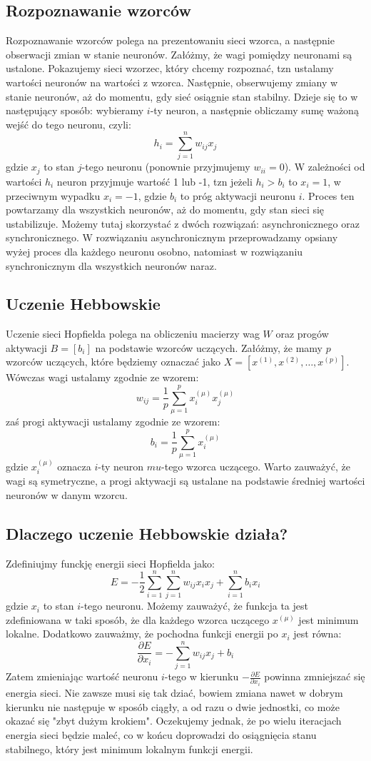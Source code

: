 \documentclass{article}
\begin{document}
\subsection{Rozpoznawanie wzorców}
Rozpoznawanie wzorców polega na prezentowaniu sieci wzorca, a następnie obserwacji zmian w stanie neuronów.
Załóżmy, że wagi pomiędzy neuronami są ustalone.
Pokazujemy sieci wzorzec, który chcemy rozpoznać, tzn ustalamy wartości neuronów na wartości z wzorca.
Następnie, obserwujemy zmiany w stanie neuronów, aż do momentu, gdy sieć osiągnie stan stabilny.
Dzieje się to w następujący sposób: wybieramy $i$-ty neuron, 
a następnie obliczamy sumę ważoną wejść do tego neuronu, czyli:
$$h_i = \sum_{j=1}^{n} w_{ij} x_j$$
gdzie $x_j$ to stan $j$-tego neuronu (ponownie przyjmujemy $w_{ii} = 0$). 
W zależności od wartości $h_i$ neuron przyjmuje wartość 1 lub -1, 
tzn jeżeli $h_i > b_{i}$ to $x_i = 1$, w przeciwnym wypadku $x_i = -1$,
gdzie $b_{i}$ to próg aktywacji neuronu $i$. Proces ten powtarzamy dla wszystkich neuronów, aż do momentu, gdy stan sieci się ustabilizuje.
Możemy tutaj skorzystać z dwóch rozwiązań: asynchronicznego oraz synchronicznego.
W rozwiązaniu asynchronicznym przeprowadzamy opsiany wyżej proces dla każdego neuronu osobno,
natomiast w rozwiązaniu synchronicznym dla wszystkich neuronów naraz.


\subsection{Uczenie Hebbowskie}
Uczenie sieci Hopfielda polega na obliczeniu macierzy wag $W$ oraz progów aktywacji $B = [b_i]$ 
na podstawie wzorców uczących. Załóżmy, że mamy $p$ wzorców uczących, które będziemy oznaczać jako $X = [x^{(1)}, x^{(2)}, \ldots, x^{(p)}]$.
Wówczas wagi ustalamy zgodnie ze wzorem:
$$w_{ij} = \frac{1}{p} \sum_{\mu=1}^{p} x_i^{(\mu)} x_j^{(\mu)}$$
zaś progi aktywacji ustalamy zgodnie ze wzorem:
$$b_i = \frac{1}{p}\sum_{\mu=1}^{p} x_i^{(\mu)}$$
gdzie $x_i^{(\mu)}$ oznacza $i$-ty neuron $mu$-tego wzorca uczącego.
Warto zauważyć, że wagi są symetryczne, a progi aktywacji są ustalane na podstawie średniej wartości neuronów w danym wzorcu.

\subsection{Dlaczego uczenie Hebbowskie działa?}
Zdefiniujmy funckję energii sieci Hopfielda jako:
$$E = -\frac{1}{2} \sum_{i=1}^{n} \sum_{j=1}^{n} w_{ij} x_i x_j + \sum_{i=1}^{n} b_i x_i$$
gdzie $x_i$ to stan $i$-tego neuronu.
Możemy zauważyć, że funkcja ta jest zdefiniowana w taki sposób, że dla każdego wzorca uczącego $x^{(\mu)}$ jest minimum lokalne.
Dodatkowo zauważmy, że pochodna funkcji energii po $x_i$ jest równa:
$$\frac{\partial E}{\partial x_i} = -\sum_{j=1}^{n} w_{ij} x_j + b_i$$
Zatem zmieniając wartość neuronu $i$-tego w kierunku $-\frac{\partial E}{\partial x_i}$ powinna zmniejszać się energia sieci.
Nie zawsze musi się tak dziać, bowiem zmiana nawet w dobrym kierunku nie następuje w sposób ciągły, a od razu o dwie jednostki,
co może okazać się "zbyt dużym krokiem". Oczekujemy jednak, że po wielu iteracjach energia sieci będzie maleć,
co w końcu doprowadzi do osiągnięcia stanu stabilnego, który jest minimum lokalnym funkcji energii.
\end{document}
